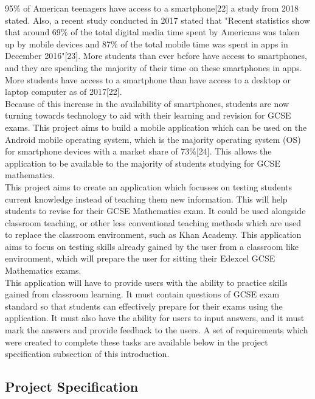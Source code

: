 \documentclass{article}
\begin{document}
95\% of American teenagers have access to a smartphone[22] a study from 2018 stated. Also, a recent study conducted in 2017 stated that "Recent statistics show that around 69\% of the total digital media time spent by Americans was taken up by mobile devices and 87\% of the total mobile time was spent in apps in December 2016"[23]. More students than ever before have access to smartphones, and they are spending the majority of their time on these smartphones in apps. More students have access to a smartphone than have access to a desktop or laptop computer as of 2017[22]. \\

Because of this increase in the availability of smartphones, students are now turning towards technology to aid with their learning and revision for GCSE exams. This project aims to build a mobile application which can be used on the Android mobile operating system, which is the majority operating system (OS) for smartphone devices with a market share of 73\%[24]. This allows the application to be available to the majority of students studying for GCSE mathematics. \\

This project aims to create an application which focusses on testing students current knowledge instead of teaching them new information. This will help students to revise for their GCSE Mathematics exam. It could be used alongside classroom teaching, or other less conventional teaching methods which are used to replace the classroom environment, such as Khan Academy. This application aims to focus on testing skills already gained by the user from a classroom like environment, which will prepare the user for sitting their Edexcel GCSE Mathematics exams. \\

This application will have to provide users with the ability to practice skills gained from classroom learning. It must contain questions of GCSE exam standard so that students can effectively prepare for their exams using the application. It must also have the ability for users to input answers, and it must mark the answers and provide feedback to the users. A set of requirements which were created to complete these tasks are available below in the project specification subsection of this introduction. \\

\subsection{Project Specification}
\end{document}

